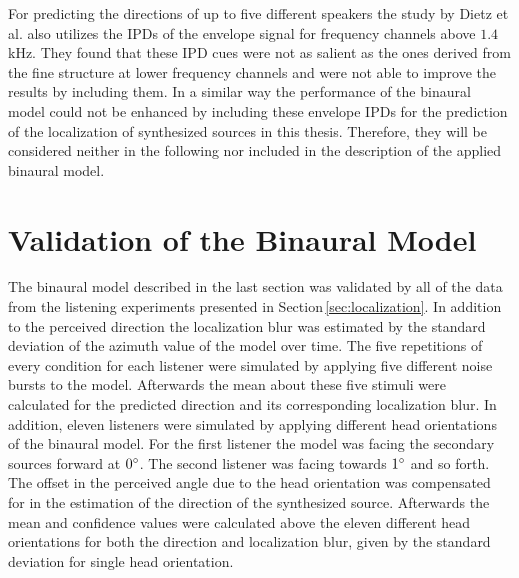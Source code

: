 For predicting the directions of up to five different speakers the study by
Dietz et al.\autocite{Dietz2011} also utilizes the \acp{IPD} of the envelope
signal for frequency channels above $1.4$\,kHz. They found that these \ac{IPD}
cues were not as salient as the ones derived from the fine structure at lower
frequency channels and were not able to improve the results by including them.
In a similar way the performance of the binaural model could not be enhanced by
including these envelope \acp{IPD} for the prediction of the localization of
synthesized sources in this thesis. Therefore, they will be considered neither in the
following nor included in the description of the applied
binaural model.


\section{Validation of the Binaural Model}
\label{sec:validation_of_the_binaural_model}
%
The binaural model described in the last section was validated by all of the
data from the listening experiments presented in Section\,\ref{sec:localization}.
In addition to the perceived direction the localization blur was estimated by
the standard deviation of the azimuth value of the model over time.
The five repetitions of every condition for each listener were simulated by
applying five different noise bursts to the model. Afterwards the mean about
these five stimuli were calculated for the predicted direction and its
corresponding localization blur.
In addition, eleven listeners were simulated by applying different head
orientations of the binaural model. For the first listener the model was facing
the secondary sources forward at $0^\circ$. The second listener was facing
towards $1^\circ$ and so forth. The offset in the perceived angle due to the
head orientation was compensated for in the estimation of the direction of the
synthesized source. Afterwards the mean and confidence values were calculated
above the eleven different head orientations for both the direction and
localization blur, given by the standard deviation for single head orientation.

